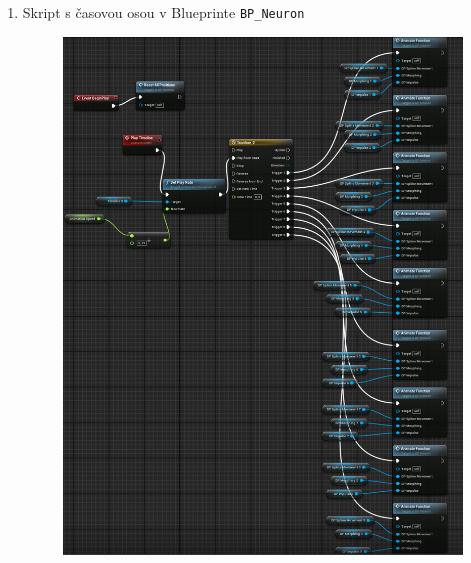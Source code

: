\begin{enumerate}[leftmargin=*]
    \item Skript s časovou osou v Blueprinte \texttt{BP\_Neuron} \label{att:main-animate}
    \begin{figure}[!htbp]
        \centering
        \includegraphics[width=16cm]{img/main-animate.png}
    \end{figure}
    \newpage

\end{enumerate}
